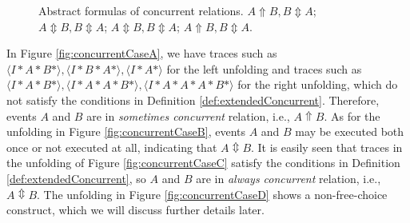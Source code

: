\documentclass{llncs}
\begin{document}
\begin{figure}[htbp]
{\begin{minipage}[b]{0.35\textwidth}
	\end{minipage}
	\label{fig:concurrentCaseC}
}
\caption{Abstract formulas of concurrent relations.  $A\Uparrow B,B\Updownarrow A$;  $A\Updownarrow B,B\Updownarrow A$;  $A\Updownarrow B,B\Updownarrow A$;  $A\Uparrow B,B\Updownarrow A$.\label{fig:concurrentCases}}
\end{figure}

In Figure \ref{fig:concurrentCaseA}, we have traces such as $\langle I*A*B*\rangle ,\langle I*B*A*\rangle ,\langle I*A*\rangle $ for the left unfolding and traces such as $\langle I*A*B*\rangle ,\langle I*A*A*B*\rangle ,\langle I*A*A*A*B*\rangle$ for the right unfolding, which do not satisfy the conditions in Definition \ref{def:extendedConcurrent}. Therefore, events $A$ and $B$ are in \textit{sometimes concurrent} relation, i.e., $A\Uparrow B$. As for the unfolding in Figure \ref{fig:concurrentCaseB}, events $A$ and $B$ may be executed both once or not executed at all, indicating that $A\Updownarrow B$. It is easily seen that traces in the unfolding of Figure \ref{fig:concurrentCaseC} satisfy the conditions in Definition \ref{def:extendedConcurrent}, so $A$ and $B$ are in \textit{always concurrent} relation, i.e., $A\Updownarrow B$. The unfolding in Figure \ref{fig:concurrentCaseD} shows a non-free-choice construct, which we will discuss further details later.
\end{document}
